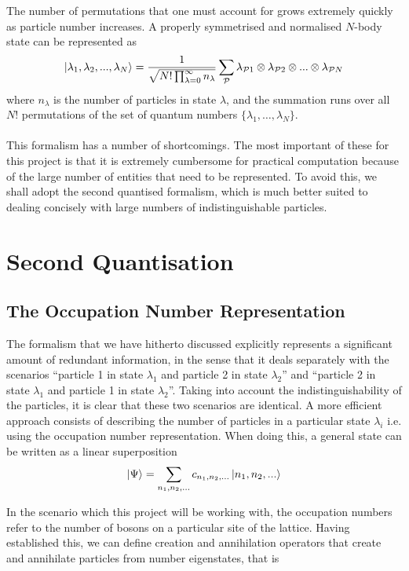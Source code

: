 \documentclass[a4paper,10pt]{article}
\begin{document}
The number of permutations that one must account for grows extremely quickly as particle number increases. A properly symmetrised and normalised $N$-body state can be
represented as 
\begin{equation}
 \ket{\lambda_1,\lambda_2,...,\lambda_N}=\frac{1}{\sqrt{N!\prod_{\lambda=0}^{\infty}{n_{\lambda}}}}\sum_{\mathcal{P}}\lambda_{\mathcal{P}1}\otimes\lambda_{\mathcal{P}2}\otimes...\otimes\lambda_{\mathcal{P}N}
\end{equation}
where $n_{\lambda}$ is the number of particles in state $\lambda$, and the summation runs over all $N!$ permutations of the set of quantum numbers $\{ \lambda_1,\dots,\lambda_N\}$.
\\\\
This formalism has a number of shortcomings. The most important of these for this project is that it is extremely cumbersome for practical computation because of the large number of entities that need to be 
represented. To avoid this, we shall adopt the second quantised formalism, which is much better suited to dealing concisely with large numbers of indistinguishable particles.

\section{Second Quantisation}
\subsection{The Occupation Number Representation}
The formalism that we have hitherto discussed explicitly represents a significant amount of redundant information, in the sense that it deals separately with the scenarios ``particle 1 in state $\lambda_1$ and 
particle 2 in state $\lambda_2$'' and ``particle 2 in state $\lambda_1$ and particle 1 in state $\lambda_2$''. Taking into account the indistinguishability of the particles, it is clear that these two scenarios
are identical. A more efficient approach consists of describing the number of particles in a particular state $\lambda_i$ i.e. using the occupation number representation. When doing this, a general 
state can be written as a linear superposition
\begin{equation}
 \ket{\Psi}=\sum_{n_1,n_2,...}c_{n_1,n_2,...}\ket{n_1,n_2,...}
\end{equation}

In the scenario which this project will be working with, the occupation numbers refer to the number of bosons on a particular site of the lattice.
Having established this, we can define creation and annihilation operators that create and annihilate particles from number eigenstates, that is
\end{document}
